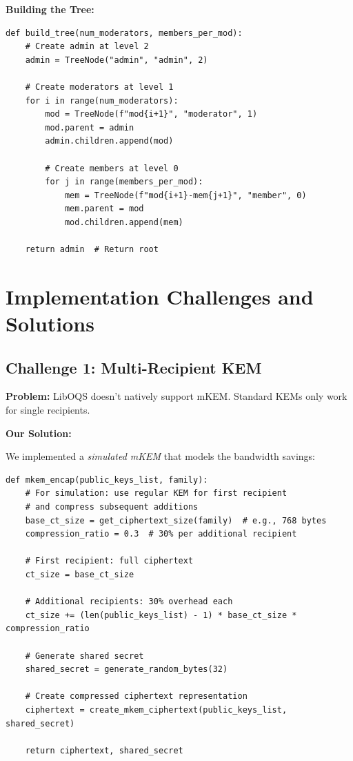 \documentclass[12pt,a4paper]{report}
\begin{document}
\textbf{Building the Tree:}

\begin{verbatim}
def build_tree(num_moderators, members_per_mod):
    # Create admin at level 2
    admin = TreeNode("admin", "admin", 2)
    
    # Create moderators at level 1
    for i in range(num_moderators):
        mod = TreeNode(f"mod{i+1}", "moderator", 1)
        mod.parent = admin
        admin.children.append(mod)
        
        # Create members at level 0
        for j in range(members_per_mod):
            mem = TreeNode(f"mod{i+1}-mem{j+1}", "member", 0)
            mem.parent = mod
            mod.children.append(mem)
    
    return admin  # Return root
\end{verbatim}

\section{Implementation Challenges and Solutions}

\subsection{Challenge 1: Multi-Recipient KEM}

\textbf{Problem:} LibOQS doesn't natively support mKEM. Standard KEMs only work for single recipients.

\textbf{Our Solution:}

We implemented a \textit{simulated mKEM} that models the bandwidth savings:

\begin{verbatim}
def mkem_encap(public_keys_list, family):
    # For simulation: use regular KEM for first recipient
    # and compress subsequent additions
    base_ct_size = get_ciphertext_size(family)  # e.g., 768 bytes
    compression_ratio = 0.3  # 30% per additional recipient
    
    # First recipient: full ciphertext
    ct_size = base_ct_size
    
    # Additional recipients: 30% overhead each
    ct_size += (len(public_keys_list) - 1) * base_ct_size * compression_ratio
    
    # Generate shared secret
    shared_secret = generate_random_bytes(32)
    
    # Create compressed ciphertext representation
    ciphertext = create_mkem_ciphertext(public_keys_list, shared_secret)
    
    return ciphertext, shared_secret
\end{verbatim}
\end{document}
